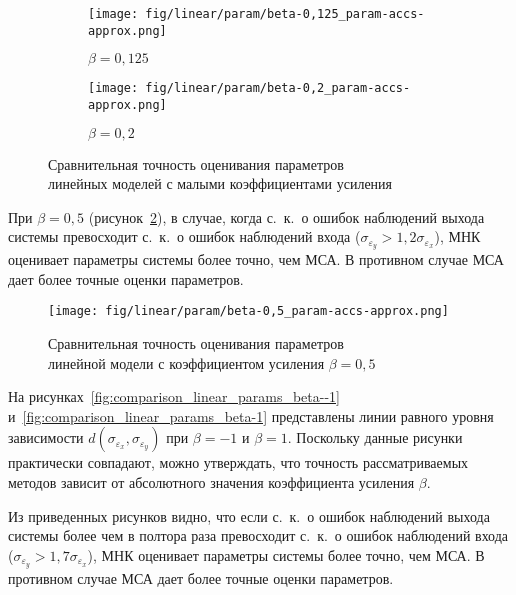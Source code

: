 \begin{figure}[p]
  \begin{subfigure}[b]{\linewidth}
    \centering
    \texttt{[image: fig/linear/param/beta-0,125\_param-accs-approx.png]}
    \caption{\( \beta = 0{,}125 \)}
  \end{subfigure}

  \vspace{2\baselineskip}
  \begin{subfigure}[b]{\linewidth}
    \centering
    \texttt{[image: fig/linear/param/beta-0,2\_param-accs-approx.png]}
    \caption{\( \beta = 0{,}2 \)}
  \end{subfigure}

  \vspace{\baselineskip}
  \caption{%
    Сравнительная точность оценивания параметров \\
    линейных моделей с малыми коэффициентами усиления
  }\label{fig:comparison_linear_params_beta-small}
\end{figure}

При \( \beta = 0{,}5 \) (рисунок~\ref{fig:comparison_linear_params_beta-0,5}),
в случае, когда с.~к.~о ошибок наблюдений выхода системы превосходит
с.~к.~о ошибок наблюдений входа (\(\sigma_{\varepsilon_y} > 1{,}2 \sigma_{\varepsilon_x}\)),
МНК оценивает параметры системы более точно, чем МСА.
В противном случае МСА дает более точные оценки параметров.

\begin{figure}[h]
  \centering
  \texttt{[image: fig/linear/param/beta-0,5\_param-accs-approx.png]}
  \caption{%
    Сравнительная точность оценивания параметров \\
    линейной модели с коэффициентом усиления \( \beta = 0{,}5 \)
  }\label{fig:comparison_linear_params_beta-0,5}
\end{figure}

На рисунках~\ref{fig:comparison_linear_params_beta--1} и~\ref{fig:comparison_linear_params_beta-1}
представлены линии равного уровня зависимости \( d(\sigma_{\varepsilon_x}, \sigma_{\varepsilon_y}) \)
при \( \beta = -1 \) и \( \beta = 1 \).
Поскольку данные рисунки практически совпадают, можно утверждать, что точность рассматриваемых методов
зависит от абсолютного значения коэффициента усиления \( \beta \).

Из приведенных рисунков видно, что если с.~к.~о ошибок наблюдений выхода системы
более чем в полтора раза превосходит с.~к.~о ошибок наблюдений входа
(\( \sigma_{\varepsilon_y} > 1{,}7 \sigma_{\varepsilon_x} \)),
МНК оценивает параметры системы более точно, чем МСА.
В противном случае МСА дает более точные оценки параметров.

